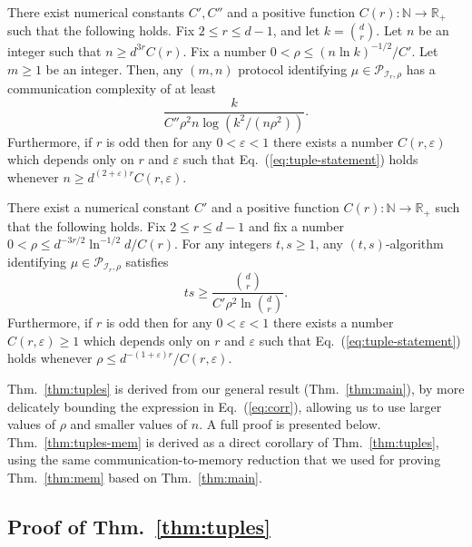 \documentclass[final, 12pt]{colt2018}
\renewcommand{\eqref}[1]{Eq.~(\ref{#1})}
\newcommand{\thmref}[1]{Thm.~\ref{#1}}
\begin{document}
\begin{theorem} \label{thm:tuples}
There exist numerical constants $C',C''$ and a positive function $C(r) \colon \mathbb{N} \to \mathbb{R}_+$ such that the following holds. Fix $2 \le r \le d-1$, and let $k = \binom{d}{r}$.
Let $n$ be an integer such that $n \ge d^{3 r} C(r)$.
Fix a number $0 < \rho \le (n \ln k)^{-1/2}/C'$.
Let $m\ge 1$ be an integer.
Then, any $(m,n)$ protocol identifying  $\mu \in \mathcal{P}_{\mathcal{I}_r,\rho}$ has a communication complexity of at least
\begin{equation}\label{eq:tuple-statement}
\frac{k}{C'' \rho^2 n \log (k^2 /(n\rho^2))}.
\end{equation}
Furthermore, if $r$ is odd then for any $0 < \varepsilon < 1$ there exists a number $C(r,\varepsilon)$ which depends only on $r$ and $\varepsilon$ such that \eqref{eq:tuple-statement} holds whenever $n \ge d^{(2+\varepsilon) r} C(r, \varepsilon)$.
\end{theorem}

\begin{theorem} \label{thm:tuples-mem}
There exist a numerical constant $C'$ and a positive function $C(r) \colon \mathbb{N} \to \mathbb{R}_+$ such that the following holds.
Fix $2 \le r \le d-1$ and fix a number $0 < \rho \le d^{-3r/2} \ln^{-1/2}d/C(r)$. For any integers $t,s\ge 1$, any $(t,s)$-algorithm identifying  $\mu \in \mathcal{P}_{\mathcal{I}_r,\rho}$ satisfies
\begin{equation*}
ts \ge \frac{\binom{d}{r}}{C' \rho^2\ln \binom{d}{r} }.
\end{equation*}
Furthermore, if $r$ is odd then for any $0 < \varepsilon < 1$ there exists a number $C(r,\varepsilon)\ge 1$ which depends only on $r$ and $\varepsilon$ such that \eqref{eq:tuple-statement} holds whenever $\rho \le d^{-(1+\varepsilon) r} /C(r, \varepsilon)$.
\end{theorem}

\thmref{thm:tuples} is derived from our general result (\thmref{thm:main}), by more delicately bounding the expression in \eqref{eq:corr}, allowing us to use larger values of $\rho$ and smaller values of $n$. A full proof is presented below. \thmref{thm:tuples-mem} is derived as a direct corollary of \thmref{thm:tuples}, using the same communication-to-memory reduction that we used for proving \thmref{thm:mem} based on \thmref{thm:main}. 

\subsection{Proof of \thmref{thm:tuples}}
\end{document}
